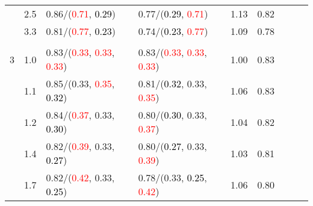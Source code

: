 \documentclass[10pt,a4paper]{report}
\begin{document}
\begin{table}[!htbp]
\begin{center}
{\begin{tabular}{ccllccccc}
				  & 2.5                               & 0.86/(\textcolor{red}{0.71}, \textcolor{black}{0.29})                                             & 0.77/(\textcolor{black}{0.29}, \textcolor{red}{0.71})                                             & 1.13             & 0.82                     \\
				  & 3.3                               & 0.81/(\textcolor{red}{0.77}, \textcolor{black}{0.23})                                             & 0.74/(\textcolor{black}{0.23}, \textcolor{red}{0.77})                                             & 1.09             & 0.78                     \\
				  &                                   &                                                                                                   &                                                                                                   &                                             \\
				3 & 1.0                               & 0.83/(\textcolor{red}{0.33}, \textcolor{red}{0.33}, \textcolor{red}{0.33})                        & 0.83/(\textcolor{red}{0.33}, \textcolor{red}{0.33}, \textcolor{red}{0.33})                        & 1.00             & 0.83                     \\
				  & 1.1                               & 0.85/(0.33, \textcolor{red}{0.35}, \textcolor{black}{0.32})                                       & 0.81/(\textcolor{black}{0.32}, 0.33, \textcolor{red}{0.35})                                       & 1.06             & 0.83                     \\
				  & 1.2                               & 0.84/(\textcolor{red}{0.37}, 0.33, \textcolor{black}{0.30})                                       & 0.80/(\textcolor{black}{0.30}, 0.33, \textcolor{red}{0.37})                                       & 1.04             & 0.82                     \\
				  & 1.4                               & 0.82/(\textcolor{red}{0.39}, 0.33, \textcolor{black}{0.27})                                       & 0.80/(\textcolor{black}{0.27}, 0.33, \textcolor{red}{0.39})                                       & 1.03             & 0.81                     \\
				  & 1.7                               & 0.82/(\textcolor{red}{0.42}, 0.33, \textcolor{black}{0.25})                                       & 0.78/(0.33, \textcolor{black}{0.25}, \textcolor{red}{0.42})                                       & 1.06             & 0.80                     \\

\end{tabular}}
\end{center}
\end{table}
\end{document}
